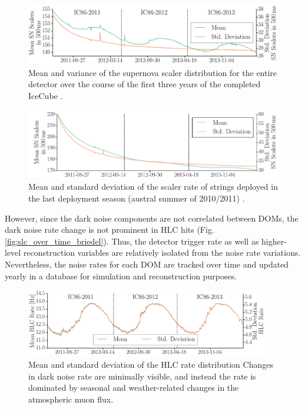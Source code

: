 \begin{figure}[!h]
 \centering
 \includegraphics[width=1.0\textwidth]{graphics/dom/performance/darknoise/briedel1.png}
 \caption{Mean and variance of the supernova scaler distribution for the
   entire detector over the course of the first three years of the
   completed IceCube \cite{briedel_phd}.} 
 \label{fig:noise_over_time_briedel}
\end{figure}

\begin{figure}[!h]
 \centering
 \includegraphics[width=1.0\textwidth]{graphics/dom/performance/darknoise/briedel4.png}
 \caption{Mean and standard deviation of the scaler rate of strings
   deployed in the last deployment season (austral summer of 2010/2011)
   \cite{briedel_phd}.} 
 \label{fig:noise_over_time_briedel_lastseasondepoyed}
\end{figure}

However, since the dark noise components are not correlated between
DOMs, the dark noise rate change is not prominent in HLC hits (Fig.
\ref{fig:slc_over_time_briedel}).  Thus, the detector trigger rate as well
as higher-level reconstruction variables are relatively isolated from the
noise rate variations.  Nevertheless, the noise rates for each DOM are
tracked over time and updated yearly in a database for simulation and
reconstruction purposes. 

\begin{figure}[!h]
 \centering
 \includegraphics[width=0.95\textwidth]{graphics/dom/performance/darknoise/briedel2.png}
 \caption{Mean and standard deviation of the HLC rate distribution
   \cite{briedel_phd}  Changes in dark noise rate are minimally visible,
   and instead the rate is dominated by seasonal and weather-related
   changes in the atmospheric muon flux.} 
 \label{fig:hlc_over_time_briedel}
\end{figure}



